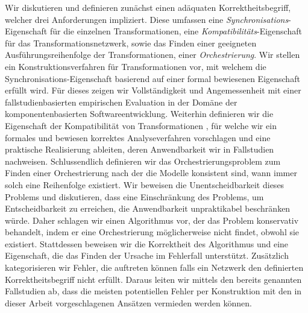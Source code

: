 Wir diskutieren und definieren zunächst einen adäquaten Korrektheitsbegriff, welcher drei Anforderungen impliziert. Diese umfassen eine \emph{Synchronisations}-Eigenschaft für die einzelnen Transformationen, eine \emph{Kompatibilitäts}-Eigenschaft für das Transformationsnetzwerk, sowie das Finden einer geeigneten Ausführungsreihenfolge der Transformationen, einer \emph{Orchestrierung}.
Wir stellen ein Konstruktionsverfahren für Transformationen vor, mit welchem die Synchronisations-Eigenschaft basierend auf einer formal bewiesenen Eigenschaft erfüllt wird.
Für dieses zeigen wir Vollständigkeit und Angemessenheit mit einer fallstudienbasierten empirischen Evaluation in der Domäne der komponentenbasierten Softwareentwicklung.
Weiterhin definieren wir die Eigenschaft der Kompatibilität von Transformationen%
, für welche wir ein formales und bewiesen korrektes Analyseverfahren vorschlagen und eine praktische Realisierung ableiten, deren Anwendbarkeit wir in Fallstudien nachweisen.
Schlussendlich definieren wir das Orchestrierungsproblem zum Finden einer Orchestrierung nach der die Modelle konsistent sind, wann immer solch eine Reihenfolge existiert. %
Wir beweisen die Unentscheidbarkeit dieses Problems und diskutieren, dass eine Einschränkung des Problems, um Entscheidbarkeit zu erreichen, die Anwendbarkeit unpraktikabel beschränken würde.
Daher schlagen wir einen Algorithmus vor, der das Problem konservativ behandelt, indem er eine Orchestrierung möglicherweise nicht findet, obwohl sie existiert.
Stattdessen beweisen wir die Korrektheit des Algorithmus und eine Eigenschaft, die das Finden der Ursache im Fehlerfall unterstützt.
Zusätzlich kategorisieren wir Fehler, die auftreten können falls ein Netzwerk den definierten Korrektheitsbegriff nicht erfüllt.
Daraus leiten wir mittels den bereits genannten Fallstudien ab, dass die meisten potentiellen Fehler per Konstruktion mit den in dieser Arbeit vorgeschlagenen Ansätzen vermieden werden können.


